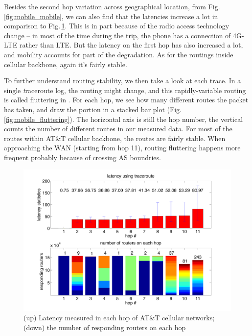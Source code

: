 Besides the second hop variation across geographical location, from Fig.\,\ref{fig:mobile_mobile}, we can also find that the latencies increase a lot in comparison to Fig.\,\ref{fig:mobile_latency}. This is in part because of the radio access technology change -- in most of the time during the trip, the phone has a connection of 4G-LTE rather than LTE. But the latency on the first hop has also increased a lot, and mobility accounts for part of the degradation. As for the routings inside cellular backbone, again it's fairly stable.

To further understand routing stability, we then take a look at each trace. In a single {\textit traceroute} log, the routing might change, and this rapidly-variable routing is called fluttering in \cite{paxson1997measurements}. For each hop, we see how many different routes the packet has taken, and draw the portion in a stacked bar plot (Fig.\,\ref{fig:mobile_fluttering}). The horizontal axis is still the hop number, the vertical counts the number of different routes in our measured data. For most of the routes within AT\&T cellular backbone, the routes are fairly stable. When approaching the WAN (starting from hop 11), routing fluttering happens more frequent probably because of crossing AS boundries.

\begin{figure}
  \centering
  \includegraphics[width=\linewidth]{../figs/mobile_latency.pdf}
  \vspace{-1em}
  \caption{(up) Latency measured in each hop of AT\&T cellular networks; (down) the number of responding routers on each hop}
  \label{fig:mobile_latency}
\end{figure}

